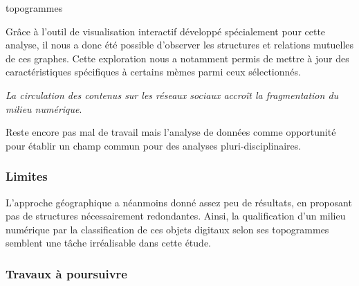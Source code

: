 topogrammes

Gr\^ace à l{\textquoteright}outil de visualisation interactif développé spécialement pour cette analyse, il nous a donc été possible d{\textquoteright}observer les structures et relations mutuelles de ces graphes. Cette exploration nous a notamment permis de mettre à jour des caractéristiques spécifiques à certains mèmes parmi ceux sélectionnés.



\textit{La circulation des contenus sur les réseaux sociaux accroît la fragmentation du milieu numérique}.

Reste encore pas mal de travail mais l'analyse de données comme opportunité pour établir un champ commun pour des analyses pluri-disciplinaires.







\subsubsection[Limites]{Limites} 

L{\textquoteright}approche géographique a néanmoins donné assez peu de résultats, en proposant pas de structures nécessairement redondantes. Ainsi, la qualification d{\textquoteright}un milieu numérique par la classification de ces objets digitaux selon ses topogrammes semblent une t\^ache irréalisable dans cette étude. 





\subsubsection[Travaux à poursuivre]{Travaux à poursuivre} 


